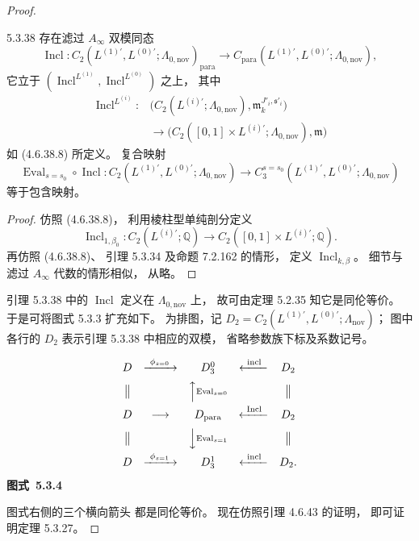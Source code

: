 \begin{proof}
\begin{lemma}{5.3.38}\label{lem:5-3-38}
存在滤过 $A_\infty$ 双模同态
\[
\operatorname{Incl}\colon
C_2(L^{(1)\prime},L^{(0)\prime};
\Lambda_{0,\mathrm{nov}})_{\mathrm{para}}
\longrightarrow
C_{\mathrm{para}}
(L^{(1)\prime},L^{(0)\prime};
\Lambda_{0,\mathrm{nov}}),
\]
它立于
$(\operatorname{Incl}^{L^{(1)}},
\operatorname{Incl}^{L^{(0)}})$ 之上，
其中
\[
\begin{aligned}
\operatorname{Incl}^{L^{(i)}}\colon&
\bigl(C_2(L^{(i)\prime};
\Lambda_{0,\mathrm{nov}}),
\mathfrak m_k^{J'_i,\mathfrak s'_i}\bigr)\\
&\longrightarrow
\bigl(
C_2([0,1]\times L^{(i)\prime};
\Lambda_{0,\mathrm{nov}}),\mathfrak m
\bigr)
\end{aligned}
\]
如 (4.6.38.8) 所定义。
复合映射
\[
\operatorname{Eval}_{s=s_0}
\circ\operatorname{Incl}\colon
C_2(L^{(1)\prime},L^{(0)\prime};
\Lambda_{0,\mathrm{nov}})
\longrightarrow
C_3^{s=s_0}
(L^{(1)\prime},L^{(0)\prime};
\Lambda_{0,\mathrm{nov}})
\]
等于包含映射。
\end{lemma}

\begin{proof}
仿照 (4.6.38.8)，
利用棱柱型单纯剖分定义
\[
\operatorname{Incl}_{1,\beta_0}\colon
C_2(L^{(i)\prime};\mathbb Q)
\longrightarrow
C_2([0,1]\times L^{(i)\prime};
\mathbb Q).
\]
再仿照 (4.6.38.8)、
引理 5.3.34
及命题 7.2.162 的情形，
定义 $\operatorname{Incl}_{k,\beta}$。
细节与滤过 $A_\infty$ 代数的情形相似，
从略。
\end{proof}

引理 5.3.38 中的
$\operatorname{Incl}$ 定义在
$\Lambda_{0,\mathrm{nov}}$ 上，
故可由定理 5.2.35 知它是同伦等价。
于是可将图式 5.3.3 扩充如下。
为排图，记
$D_2=C_2(L^{(1)\prime},L^{(0)\prime};
\Lambda_{\mathrm{nov}})$；
图中各行的 $D_2$
表示引理 5.3.38 中相应的双模，
省略参数族下标及系数记号。
\begin{center}
\[
\begin{array}{ccccc}
D&\xrightarrow{\ \phi_{s=0}\ }&
D_3^0&\xleftarrow{\ \mathrm{incl}\ }&D_2\\[2mm]
\big\Vert&&
\Big\uparrow\vcenter{\hbox{\scriptsize
$\operatorname{Eval}_{s=0}$}}
&&\big\Vert\\[2mm]
D&\longrightarrow&
D_{\mathrm{para}}
&\xleftarrow{\ \operatorname{Incl}\ }&D_2\\[2mm]
\big\Vert&&
\Big\downarrow\vcenter{\hbox{\scriptsize
$\operatorname{Eval}_{s=1}$}}
&&\big\Vert\\[2mm]
D&\xrightarrow{\ \phi_{s=1}\ }&
D_3^1&\xleftarrow{\ \mathrm{incl}\ }&D_2 .
\end{array}
\]
\renewcommand{\thefigure}{5.3.4}
{\normalfont\bfseries 图式~\thefigure}\label{diag:5-3-4}
\end{center}
图式右侧的三个横向箭头
都是同伦等价。
现在仿照引理 4.6.43 的证明，
即可证明定理 5.3.27。
\end{proof}
